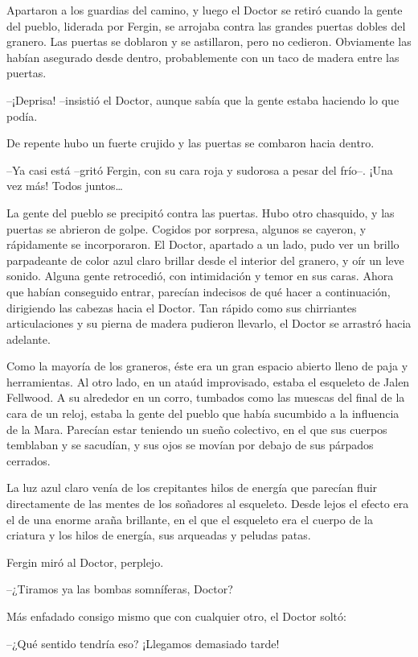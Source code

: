 Apartaron a los guardias del camino, y luego el Doctor se retiró cuando la gente del pueblo, liderada por Fergin, se arrojaba contra las grandes puertas dobles del granero. Las puertas se doblaron y se astillaron, pero no cedieron. Obviamente las habían asegurado desde dentro, probablemente con un taco de madera entre las puertas.

--¡Deprisa! --insistió el Doctor, aunque sabía que la gente estaba haciendo lo que podía.

De repente hubo un fuerte crujido y las puertas se combaron hacia dentro. 

--Ya casi está --gritó Fergin, con su cara roja y sudorosa a pesar del frío--. ¡Una vez más! Todos juntos…

La gente del pueblo se precipitó contra las puertas. Hubo otro chasquido, y las puertas se abrieron de golpe. Cogidos por sorpresa, algunos se cayeron, y rápidamente se incorporaron. El Doctor, apartado a un lado, pudo ver un brillo parpadeante de color azul claro brillar desde el interior del granero, y oír un leve sonido. Alguna gente retrocedió, con intimidación y temor en sus caras. Ahora que habían conseguido entrar, parecían indecisos de qué hacer a continuación, dirigiendo las cabezas hacia el Doctor. Tan rápido como sus chirriantes articulaciones y su pierna de madera pudieron llevarlo, el Doctor se arrastró hacia adelante.

Como la mayoría de los graneros, éste era un gran espacio abierto lleno de paja y herramientas. Al otro lado, en un ataúd improvisado, estaba el esqueleto de Jalen Fellwood. A su alrededor en un corro, tumbados como las muescas del final de la cara de un reloj, estaba la gente del pueblo que había sucumbido a la influencia de la Mara. Parecían estar teniendo un sueño colectivo, en el que sus cuerpos temblaban y se sacudían, y sus ojos se movían por debajo de sus párpados cerrados.

La luz azul claro venía de los crepitantes hilos de energía que parecían fluir directamente de las mentes de los soñadores al esqueleto. Desde lejos el efecto era el de una enorme araña brillante, en el que el esqueleto era el cuerpo de la criatura y los hilos de energía, sus arqueadas y peludas patas.

Fergin miró al Doctor, perplejo.

--¿Tiramos ya las bombas somníferas, Doctor?

Más enfadado consigo mismo que con cualquier otro, el Doctor soltó:

--¿Qué sentido tendría eso? ¡Llegamos demasiado tarde!

